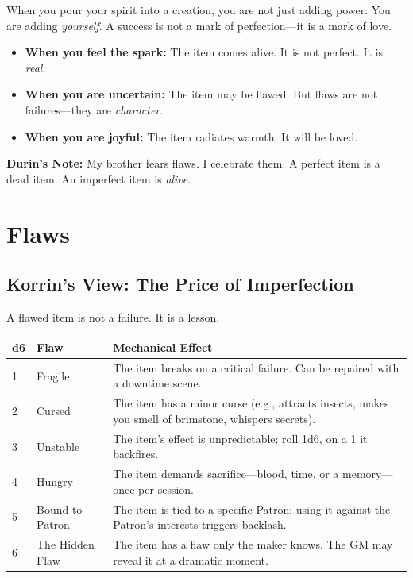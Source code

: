 \documentclass[11pt]{book}
\begin{document}
When you pour your spirit into a creation, you are not just adding power. You are adding \textit{yourself}. A success is not a mark of perfection---it is a mark of love.

\begin{itemize}
    \item \textbf{When you feel the spark:} The item comes alive. It is not perfect. It is \textit{real}.
    \item \textbf{When you are uncertain:} The item may be flawed. But flaws are not failures---they are \textit{character}.
    \item \textbf{When you are joyful:} The item radiates warmth. It will be loved.
\end{itemize}

\vspace{0.5cm}
\textbf{Durin's Note:} My brother fears flaws. I celebrate them. A perfect item is a dead item. An imperfect item is \textit{alive}.

\newpage
\section{Flaws}

\subsection*{Korrin's View: The Price of Imperfection}

A flawed item is not a failure. It is a lesson.

\begin{table}[h]
\centering
\begin{tabular}{@{}lll@{}}
\toprule
\textbf{d6} & \textbf{Flaw} & \textbf{Mechanical Effect} \\
\midrule
1 & Fragile & The item breaks on a critical failure. Can be repaired with a downtime scene. \\
2 & Cursed & The item has a minor curse (e.g., attracts insects, makes you smell of brimstone, whispers secrets). \\
3 & Unstable & The item's effect is unpredictable; roll 1d6, on a 1 it backfires. \\
4 & Hungry & The item demands sacrifice---blood, time, or a memory---once per session. \\
5 & Bound to Patron & The item is tied to a specific Patron; using it against the Patron's interests triggers backlash. \\
6 & The Hidden Flaw & The item has a flaw only the maker knows. The GM may reveal it at a dramatic moment. \\
\bottomrule
\end{tabular}
\end{table}
\end{document}
